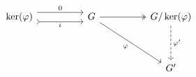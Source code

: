 \[\begin{tikzcd}
	{\ker(\varphi)} && G && {G/\ker(\varphi)} \\
	\\
	&&&& {G'}
	\arrow["\varphi"', from=1-3, to=3-5]
	\arrow["\iota"', shift right=2, tail, from=1-1, to=1-3]
	\arrow[two heads, from=1-3, to=1-5]
	\arrow["{\varphi'}", dashed, from=1-5, to=3-5]
	\arrow["0", shift left=2, from=1-1, to=1-3]
\end{tikzcd}\]